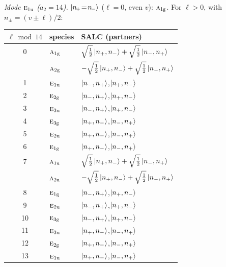 \documentclass[11pt]{article}
\newcommand{\irr}[1]{\text{\normalfont\scshape #1}}
\newcommand{\ptag}[1]{\mathrm{#1}}
\begin{document}
\emph{Mode $\irr{e}_{1\ptag{u}}$ ($a_2=14$).} $\ket{n_{\!+}\!=\!n_{\!-}}$ ($\ell=0$, even $v$): $\irr{a}_{1\ptag{g}}$. For $\ell>0$, with $n_\pm=(v\pm\ell)/2$:
\begin{longtable}{c l l}\hline $\ell\bmod 14$ & species & SALC (partners)\\ \hline\endhead
0 & $\irr{a}_{1\ptag{g}}$ & $\sqrt{\tfrac{1}{2}}\ket{n_+,n_-}+\sqrt{\tfrac{1}{2}}\ket{n_-,n_+}$\\
 & $\irr{a}_{2\ptag{g}}$ & $-\sqrt{\tfrac{1}{2}}\ket{n_+,n_-}+\sqrt{\tfrac{1}{2}}\ket{n_-,n_+}$\\
1 & $\irr{e}_{1\ptag{u}}$ & $\ket{n_-,n_+}$,\quad $\ket{n_+,n_-}$\\
2 & $\irr{e}_{2\ptag{g}}$ & $\ket{n_-,n_+}$,\quad $\ket{n_+,n_-}$\\
3 & $\irr{e}_{3\ptag{u}}$ & $\ket{n_-,n_+}$,\quad $\ket{n_+,n_-}$\\
4 & $\irr{e}_{3\ptag{g}}$ & $\ket{n_+,n_-}$,\quad $\ket{n_-,n_+}$\\
5 & $\irr{e}_{2\ptag{u}}$ & $\ket{n_+,n_-}$,\quad $\ket{n_-,n_+}$\\
6 & $\irr{e}_{1\ptag{g}}$ & $\ket{n_+,n_-}$,\quad $\ket{n_-,n_+}$\\
7 & $\irr{a}_{1\ptag{u}}$ & $\sqrt{\tfrac{1}{2}}\ket{n_+,n_-}+\sqrt{\tfrac{1}{2}}\ket{n_-,n_+}$\\
 & $\irr{a}_{2\ptag{u}}$ & $-\sqrt{\tfrac{1}{2}}\ket{n_+,n_-}+\sqrt{\tfrac{1}{2}}\ket{n_-,n_+}$\\
8 & $\irr{e}_{1\ptag{g}}$ & $\ket{n_-,n_+}$,\quad $\ket{n_+,n_-}$\\
9 & $\irr{e}_{2\ptag{u}}$ & $\ket{n_-,n_+}$,\quad $\ket{n_+,n_-}$\\
10 & $\irr{e}_{3\ptag{g}}$ & $\ket{n_-,n_+}$,\quad $\ket{n_+,n_-}$\\
11 & $\irr{e}_{3\ptag{u}}$ & $\ket{n_+,n_-}$,\quad $\ket{n_-,n_+}$\\
12 & $\irr{e}_{2\ptag{g}}$ & $\ket{n_+,n_-}$,\quad $\ket{n_-,n_+}$\\
13 & $\irr{e}_{1\ptag{u}}$ & $\ket{n_+,n_-}$,\quad $\ket{n_-,n_+}$\\
\hline\end{longtable}
\end{document}
